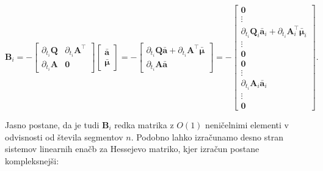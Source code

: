 \documentclass[isrm2, tisk]{fmfdelo}
\newcommand{\aimplicit}{\bar{\mathbf{a}}}
\newcommand{\muimplicit}{\bar{\boldsymbol{\mu}}}
\newcommand{\qmat}{\mathbf{Q}}
\newcommand{\amat}{\mathbf{A}}
\begin{document}
\begin{equation}
    \mathbf{B}_i = 
    - \begin{bmatrix}
        \partial_{t_i}\qmat & \partial_{t_i} \amat^{\top} \\
        \partial_{t_i} \amat & \mathbf{0}
    \end{bmatrix}
    \begin{bmatrix}
        \aimplicit \\
        \muimplicit
    \end{bmatrix} =
    - \begin{bmatrix}
        \partial_{t_i}\qmat \aimplicit + \partial_{t_i} \amat^{\top} \muimplicit \\
        \partial_{t_i} \amat \aimplicit
    \end{bmatrix} = - \begin{bmatrix}
        \mathbf{0} \\
        \vdots \\
        \partial_{t_i} \qmat_i \aimplicit_i + \partial_{t_i} \amat_i^{\top} \muimplicit_i \\
        \vdots \\
        \mathbf{0} \\
        \mathbf{0} \\
        \vdots \\
        \partial_{t_i} \amat_i \aimplicit_i \\
        \vdots \\
        \mathbf{0}
    \end{bmatrix}.
\end{equation}

Jasno postane, da je tudi $\mathbf{B}_i$ redka matrika z $O(1)$ neničelnimi elementi v odvisnosti od števila segmentov $n$. Podobno lahko izračunamo desno stran sistemov linearnih enačb za Hessejevo matriko, kjer izračun postane kompleksnejši:
\end{document}
